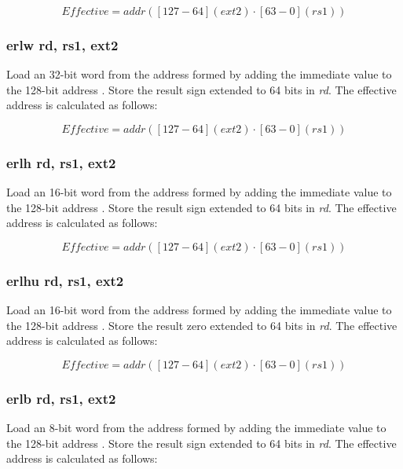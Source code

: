 \documentclass{article}
\begin{document}
\begin{equation}
Effective = addr([127-64](ext2) \cdot [63-0](rs1))
\end{equation}

\subsubsection{erlw rd, rs1, ext2}

Load an 32-bit word from the address formed by adding the immediate value to the 
128-bit address .  Store the result sign extended to 64 bits in \textit{rd}.  
The effective address is calculated as follows:

\begin{equation}
Effective = addr([127-64](ext2) \cdot [63-0](rs1))
\end{equation}

\subsubsection{erlh rd, rs1, ext2}

Load an 16-bit word from the address formed by adding the immediate value to the 
128-bit address .  Store the result sign extended to 64 bits in \textit{rd}.  
The effective address is calculated as follows:

\begin{equation}
Effective = addr([127-64](ext2) \cdot [63-0](rs1))
\end{equation}

\subsubsection{erlhu rd, rs1, ext2}

Load an 16-bit word from the address formed by adding the immediate value to the 
128-bit address .  Store the result zero extended to 64 bits in \textit{rd}.  The effective 
address is calculated as follows:

\begin{equation}
Effective = addr([127-64](ext2) \cdot [63-0](rs1))
\end{equation}

\subsubsection{erlb rd, rs1, ext2}

Load an 8-bit word from the address formed by adding the immediate value to the 
128-bit address .  Store the result sign extended to 64 bits in \textit{rd}.  
The effective address is calculated as follows: 
\end{document}
